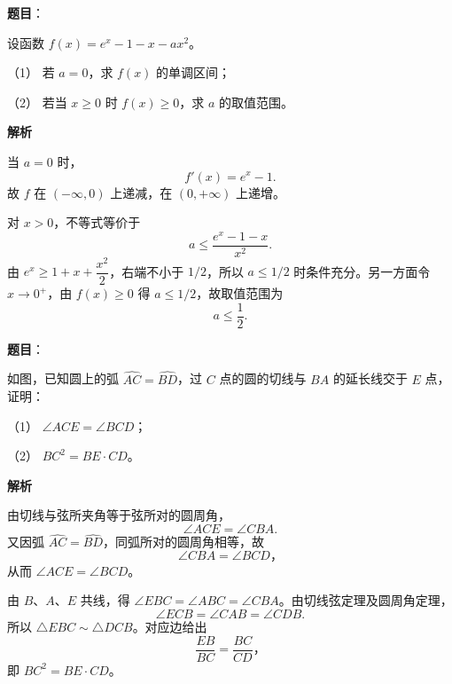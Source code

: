 \begin{answer}

\textbf{题目}：

设函数 $f(x)=e^x-1-x-ax^2$。

（1） 若 $a=0$，求 $f(x)$ 的单调区间；

（2） 若当 $x\geq0$ 时 $f(x)\geq0$，求 $a$ 的取值范围。

\textbf{解析}


当 $a=0$ 时，
\nopagebreak[4]
\[
f'(x)=e^x-1.
\]
故 $f$ 在 $(-\infty,0)$ 上递减，在 $(0,+\infty)$ 上递增。


对 $x>0$，不等式等价于
\nopagebreak[4]
\[
a\leq\frac{e^x-1-x}{x^2}.
\]
由 $e^x\geq1+x+\dfrac{x^2}{2}$，右端不小于 $1/2$，所以 $a\leq1/2$ 时条件充分。另一方面令 $x\to0^+$，由 $f(x)\geq0$ 得 $a\leq1/2$，故取值范围为
\nopagebreak[4]
\[
a\leq\frac12.
\]



\end{answer}
\begin{answer}

\textbf{题目}：

如图，已知圆上的弧 $\widehat{AC}=\widehat{BD}$，过 $C$ 点的圆的切线与 $BA$ 的延长线交于 $E$ 点，证明：
\nopagebreak[4]
\begin{center}\end{center}
\nopagebreak[4]
（1） $\angle ACE=\angle BCD$；

（2） $BC^2=BE\cdot CD$。

\textbf{解析}


由切线与弦所夹角等于弦所对的圆周角，
\nopagebreak[4]
\[
\angle ACE=\angle CBA.
\]
又因弧 $\widehat{AC}=\widehat{BD}$，同弧所对的圆周角相等，故
\nopagebreak[4]
\[
\angle CBA=\angle BCD\text{，}
\]
从而 $\angle ACE=\angle BCD$。


由 $B\text{、}A\text{、}E$ 共线，得 $\angle EBC=\angle ABC=\angle CBA$。由切线弦定理及圆周角定理，
\nopagebreak[4]
\[
\angle ECB=\angle CAB=\angle CDB.
\]
所以 $\triangle EBC\sim\triangle DCB$。对应边给出
\nopagebreak[4]
\[
\frac{EB}{BC}=\frac{BC}{CD}\text{，}
\]
即 $BC^2=BE\cdot CD$。



\end{answer}
